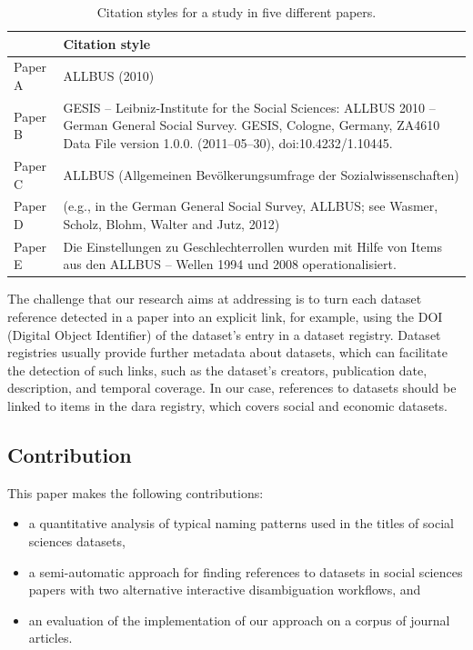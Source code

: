 \documentclass{IOS-Book-Article}
\newcommand{\dara}{\textsf{da\textbar ra}}
\begin{document}
\begin{table}[h!]
	\renewcommand{\arraystretch}{2}
	\centering
	\begin{tabular}{p{2.5cm}p{7cm}}
		\hline
		& Citation style \\
		\hline
		Paper A  & ALLBUS (2010)\\
		
		Paper B  & GESIS -- Leibniz-Institute for the Social Sciences: ALLBUS 2010 -- German General Social Survey. GESIS, Cologne, Germany, ZA4610 Data File version 1.0.0. (2011--05--30), doi:10.4232/1.10445. \\ 
		
		Paper C & ALLBUS (Allgemeinen Bev\"olkerungsumfrage der Sozialwissenschaften)\\
		
		Paper D & (e.g., in the German General Social Survey, ALLBUS; see Wasmer, Scholz, Blohm, Walter and Jutz, 2012)\\
		
		Paper E & Die Einstellungen zu Geschlechterrollen wurden mit Hilfe von Items aus den ALLBUS -- Wellen 1994 und 2008 operationalisiert.\\\hline
	\end{tabular}
	\caption{Citation styles for a study in five different papers.}
	\label{table:citation-variety}
\end{table}

The challenge that our research aims at addressing is to turn each dataset reference detected in a paper into an explicit link, for example, using the DOI (Digital Object Identifier) of the dataset's entry in a dataset registry. 
Dataset registries usually provide further metadata about datasets, which can facilitate the detection of such links, such as the dataset's creators, publication date, description, and temporal coverage.
In our case, references to datasets should be linked to items in the {\dara} registry, which covers social and economic datasets.

\subsection{Contribution}

This paper makes the following contributions:
\begin{itemize}
\item a quantitative analysis of typical naming patterns used in the titles of social sciences datasets,
\item a semi-automatic approach for finding references to datasets in social sciences papers with two alternative interactive disambiguation workflows, and
\item an evaluation of the implementation of our approach on a corpus of journal articles.  
\end{itemize}
\end{document}

